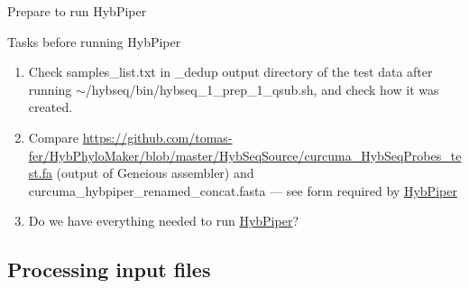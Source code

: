 \documentclass[compress,  xelatex, 11pt, xcolor=x11names, aspectratio=169,
	hyperref={
		bookmarks=true,
		unicode=true,
		colorlinks=true,
		pdftitle={HybSeq course},
		plainpages=false,
		pdfauthor={Vojtech Zeisek},
		pdfsubject={Practical processing of HybSeq target enrichment sequencing data on computing grids like MetaCentrum},
		pdfcreator={XeLaTeX},
		pdfkeywords={BASH, command line, GNU, HybSeq, Linux, MetaCentrum, sequencing shell, target enrichment},
		linkcolor=Turquoise4, %
		anchorcolor=DodgerBlue4, %
		citecolor=DodgerBlue4, %
		filecolor=DodgerBlue4, %
		menucolor=Tan4, %
		urlcolor=DarkOliveGreen4 %
		},
	url={hyphens, lowtilde} %
	]{beamer}
\renewcommand{\texttt}[1]{\colorbox{Cornsilk2}{{\ttfamily #1}}}
\begin{document}
\begin{frame}{Prepare to run HybPiper}
	\begin{exampleblock}{Tasks before running HybPiper}
		\begin{enumerate}
			\item Check \texttt{samples\_list.txt} in \texttt{2\_dedup} output directory of the test data after running \texttt{$\sim$/hybseq/bin/hybseq\_1\_prep\_1\_qsub.sh}, and check how it was created.
			\item Compare \url{https://github.com/tomas-fer/HybPhyloMaker/blob/master/HybSeqSource/curcuma_HybSeqProbes_test.fa} (output of Geneious assembler) and \texttt{curcuma\_hybpiper\_renamed\_concat.fasta} --- see form required by \href{https://github.com/mossmatters/HybPiper/wiki\#12-target-file}{HybPiper}
			\item Do we have everything needed to run \href{https://github.com/mossmatters/HybPiper/wiki}{HybPiper}?
		\end{enumerate}
	\end{exampleblock}
\end{frame}

\subsection{Processing input files}
\end{document}
